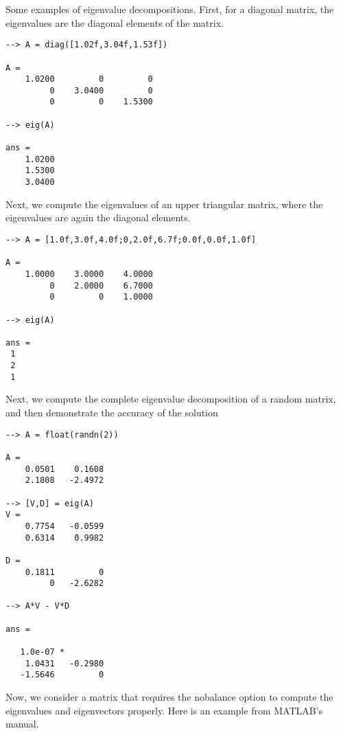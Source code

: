 Some examples of eigenvalue decompositions.  First, for a diagonal
matrix, the eigenvalues are the diagonal elements of the matrix.
\begin{verbatim}
--> A = diag([1.02f,3.04f,1.53f])

A = 
    1.0200         0         0 
         0    3.0400         0 
         0         0    1.5300 

--> eig(A)

ans = 
    1.0200 
    1.5300 
    3.0400 
\end{verbatim}
Next, we compute the eigenvalues of an upper triangular matrix, 
where the eigenvalues are again the diagonal elements.
\begin{verbatim}
--> A = [1.0f,3.0f,4.0f;0,2.0f,6.7f;0.0f,0.0f,1.0f]

A = 
    1.0000    3.0000    4.0000 
         0    2.0000    6.7000 
         0         0    1.0000 

--> eig(A)

ans = 
 1 
 2 
 1 
\end{verbatim}
Next, we compute the complete eigenvalue decomposition of
a random matrix, and then demonstrate the accuracy of the solution
\begin{verbatim}
--> A = float(randn(2))

A = 
    0.0501    0.1608 
    2.1808   -2.4972 

--> [V,D] = eig(A)
V = 
    0.7754   -0.0599 
    0.6314    0.9982 

D = 
    0.1811         0 
         0   -2.6282 

--> A*V - V*D

ans = 

   1.0e-07 * 
    1.0431   -0.2980 
   -1.5646         0 
\end{verbatim}
Now, we consider a matrix that requires the nobalance option
to compute the eigenvalues and eigenvectors properly.  Here is
an example from MATLAB's manual.
